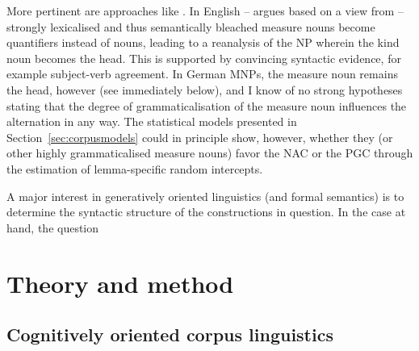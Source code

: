 \documentclass[USenglish]{article}
\begin{document}
More pertinent are approaches like \cite{Brems2003,DeclerckBrems2016}.
In English -- \cite{Brems2003} argues based on a view from \cite{Langacker1991} -- strongly lexicalised and thus semantically bleached measure nouns become quantifiers instead of nouns, leading to a reanalysis of the NP wherein the kind noun becomes the head.
This is supported by convincing syntactic evidence, for example subject-verb agreement.
In German MNPs, the measure noun remains the head, however (see immediately below), and I know of no strong hypotheses stating that the degree of grammaticalisation of the measure noun influences the alternation in any way.
The statistical models presented in Section~\ref{sec:corpusmodels} could in principle show, however, whether they (or other highly grammaticalised measure nouns) favor the NAC or the PGC through the estimation of lemma-specific random intercepts.

A major interest in generatively oriented linguistics (and formal semantics) is to determine the syntactic structure of the constructions in question.
In the case at hand, the question



\section{Theory and method}

\subsection{Cognitively oriented corpus linguistics}
\label{ssec:cocl}
\end{document}
